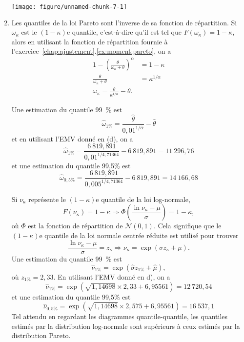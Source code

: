 \begin{exercice}
\begin{sol}
\begin{enumerate}
\begin{knitrout}
\color{fgcolor}
\texttt{[image: figure/unnamed-chunk-7-1]} 

\end{knitrout}

\item Les quantiles de la loi Pareto sont l'inverse de sa fonction de répartition. Si $\omega_\kappa$ est le $(1-\kappa)$e quantile, c'est-à-dire qu'il est tel que $F(\omega_\kappa)=1-\kappa$, alors en utilisant la fonction de répartition fournie à l'exercice~\ref{chap:ajustement}.\ref{ex:moment:pareto}, on a
\begin{align*}
1-\left(\frac{\theta}{\omega_\kappa+\theta}\right)^\alpha &= 1-\kappa\\
\frac{\theta}{\omega_\kappa+\theta} &= \kappa^{1/\alpha}\\
\omega_\kappa= \frac{\theta}{\kappa^{1/\alpha}}-\theta.
\end{align*}

Une estimation du quantile 99~\% est
$$
\hat\omega_{1\%}= \frac{\hat\theta}{0,01^{1/\hat\alpha}}-\hat\theta
$$
et en utilisant l'EMV donné en (d), on a 
$$
\hat\omega_{1\%}= \frac{6~819,891}{0,01^{1/ 4,71364}}-6~819,891=11~296,76
$$
et une estimation du quantile 99,5\% est
$$
\hat\omega_{0,5\%}= \frac{6~819,891}{0,005^{1/4,71364}}-6~819,891= 14~166,68
$$

Si $\nu_\kappa$ représente le $(1-\kappa)$e quantile de la loi log-normale,
$$
F(\nu_\kappa)=1-\kappa \Rightarrow \Phi\left(\frac{\ln\nu_\kappa-\mu}{\sigma}\right)=1-\kappa,
$$
où $\Phi$ est la fonction de répartition de $\mathcal{N}(0,1)$. Cela signifique que le $(1-\kappa)$e quantile de la loi normale centrée réduite est utilisé pour trouver
$$
\frac{\ln\nu_\kappa-\mu}{\sigma}=z_\kappa \Rightarrow \nu_\kappa = \exp(\sigma z_\kappa+\mu).
$$
Une estimation du quantile 99~\% est
$$
\hat\nu_{1\%}= \exp(\hat\sigma z_{1\%}+\hat\mu),
$$
où $z_{1\%}=2,33$. En utilisant l'EMV donné en d), on a 
$$
\hat\nu_{1\%}= \exp(\sqrt{1,14698}\times 2,33+6,95561)=12~720,54
$$
et une estimation du quantile 99,5\% est
$$
\hat\nu_{0,5\%}= \exp(\sqrt{1,14698}\times 2,575+6,95561)=16~537,1
$$
Tel attendu en regardant les diagrammes quantile-quantile, les quantiles estimés par la distribution log-normale sont supérieurs à ceux estimés par la distribution Pareto.
\end{enumerate}


\end{sol}
\end{exercice}

